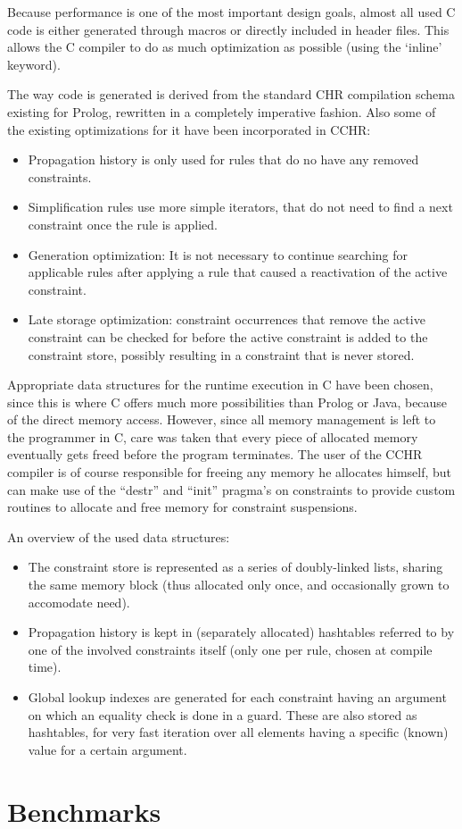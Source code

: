 \documentclass{llncs}
\begin{document}
Because performance is one of the most important design goals, almost all used C code is either generated through macros
or directly included in header files. This allows the C compiler to do as much optimization as possible (using the `inline'
keyword).

The way code is generated is derived from the standard CHR compilation schema existing for Prolog, rewritten in a completely
imperative fashion. Also some of the existing optimizations for it have been incorporated in CCHR: \begin{itemize}
  \item Propagation history is only used for rules that do no have any removed constraints.
  \item Simplification rules use more simple iterators, that do not need to find a next constraint once the rule is applied.
  \item Generation optimization: It is not necessary to continue searching for applicable rules after applying a rule that caused a reactivation of the active constraint.
  \item Late storage optimization: constraint occurrences that remove the active constraint can be checked for before the active constraint is added to the constraint store, possibly resulting in a constraint that is never stored.
\end{itemize}

Appropriate data structures for the runtime execution in C have been chosen, since this is where C offers much more
possibilities than Prolog or Java, because of the direct memory access. However, since all memory management is left to
the programmer in C, care was taken that every piece of allocated memory eventually gets freed before the program terminates.
The user of the CCHR compiler is of course responsible for freeing any memory he allocates himself, but can make use of the
``destr'' and ``init'' pragma's on constraints to provide custom routines to allocate and free memory for constraint suspensions.

An overview of the used data structures: \begin{itemize}
  \item The constraint store is represented as a series of doubly-linked lists, sharing the same memory block (thus allocated only
        once, and occasionally grown to accomodate need).
  \item Propagation history is kept in (separately allocated) hashtables referred to by one of the involved constraints itself 
        (only one per rule, chosen at compile time).
  \item Global lookup indexes are generated for each constraint having an argument on which an equality check is done in a
        guard. These are also stored as hashtables, for very fast iteration over all elements having a specific (known)
	value for a certain argument.
\end{itemize}

\section{Benchmarks}

  
\end{document}
